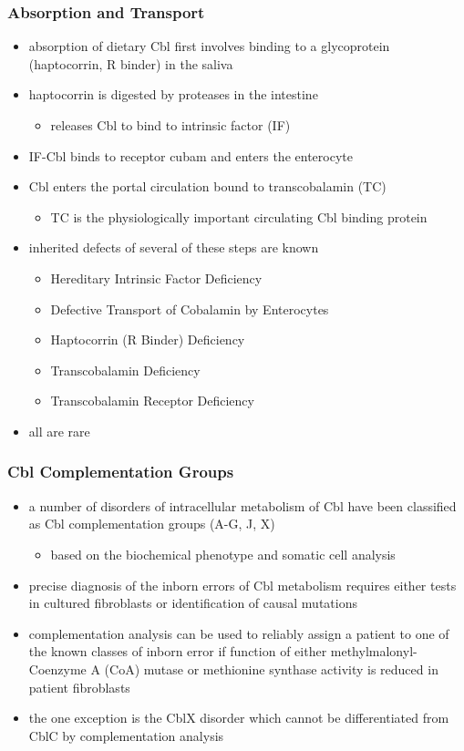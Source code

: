 \documentclass[12pt]{scrartcl}
\begin{document}
\subsubsection{Absorption and Transport}
\label{sec:org47abbf3}
\begin{itemize}
\item absorption of dietary Cbl first involves binding to a glycoprotein
(haptocorrin, R binder) in the saliva
\item haptocorrin is digested by proteases in the intestine
\begin{itemize}
\item releases Cbl to bind to intrinsic factor (IF)
\end{itemize}
\item IF-Cbl binds to receptor cubam and enters the enterocyte
\item Cbl enters the portal circulation bound to transcobalamin (TC)
\begin{itemize}
\item TC is the physiologically important circulating Cbl binding
protein
\end{itemize}
\item inherited defects of several of these steps are known
\begin{itemize}
\item Hereditary Intrinsic Factor Deficiency
\item Defective Transport of Cobalamin by Enterocytes
\item Haptocorrin (R Binder) Deficiency
\item Transcobalamin Deficiency
\item Transcobalamin Receptor Deficiency
\end{itemize}
\item all are rare
\end{itemize}
\subsubsection{Cbl Complementation Groups}
\label{sec:org99f3fb4}
\begin{itemize}
\item a number of disorders of intracellular metabolism of Cbl have been
classified as Cbl complementation groups (A-G, J, X)
\begin{itemize}
\item based on the biochemical phenotype and somatic cell analysis
\end{itemize}
\item precise diagnosis of the inborn errors of Cbl metabolism requires
either tests in cultured fibroblasts or identification of causal
mutations
\item complementation analysis can be used to reliably assign a patient to
one of the known classes of inborn error if function of either
methylmalonyl-Coenzyme A (CoA) mutase or methionine synthase
activity is reduced in patient fibroblasts
\item the one exception is the CblX disorder which cannot be
differentiated from CblC by complementation analysis
\end{itemize}
\end{document}
